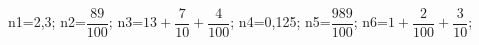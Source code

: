 \documentclass[exercice]{thedocument}%
\begin{document}
%
    \>n1={2,3};%
    \>n2=$\dfrac{89}{100}$;%
    \>n3=$13+\dfrac7{10}+\dfrac4{100}$;%
    \>n4={0,125};%
    \>n5=$\dfrac{989}{100}$;%
    \>n6=$1+\dfrac2{100}+\dfrac3{10}$;%
\end{document}

